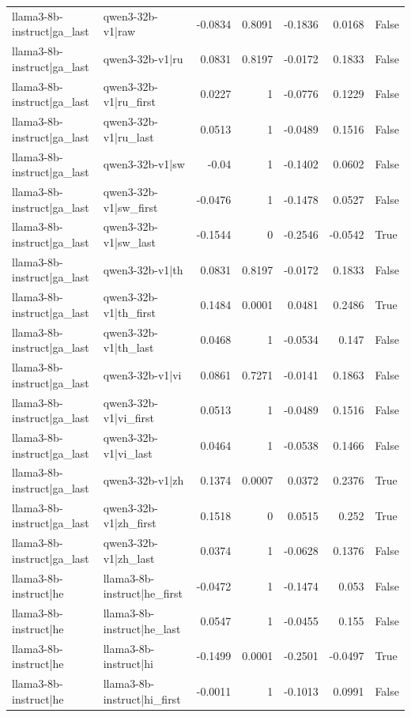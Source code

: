 \begin{table}
\begin{tabular}{l l r r r r l}
llama3-8b-instruct|ga_last & qwen3-32b-v1|raw & -0.0834 & 0.8091 & -0.1836 & 0.0168 & False \\
llama3-8b-instruct|ga_last & qwen3-32b-v1|ru & 0.0831 & 0.8197 & -0.0172 & 0.1833 & False \\
llama3-8b-instruct|ga_last & qwen3-32b-v1|ru_first & 0.0227 & 1 & -0.0776 & 0.1229 & False \\
llama3-8b-instruct|ga_last & qwen3-32b-v1|ru_last & 0.0513 & 1 & -0.0489 & 0.1516 & False \\
llama3-8b-instruct|ga_last & qwen3-32b-v1|sw & -0.04 & 1 & -0.1402 & 0.0602 & False \\
llama3-8b-instruct|ga_last & qwen3-32b-v1|sw_first & -0.0476 & 1 & -0.1478 & 0.0527 & False \\
llama3-8b-instruct|ga_last & qwen3-32b-v1|sw_last & -0.1544 & 0 & -0.2546 & -0.0542 & True \\
llama3-8b-instruct|ga_last & qwen3-32b-v1|th & 0.0831 & 0.8197 & -0.0172 & 0.1833 & False \\
llama3-8b-instruct|ga_last & qwen3-32b-v1|th_first & 0.1484 & 0.0001 & 0.0481 & 0.2486 & True \\
llama3-8b-instruct|ga_last & qwen3-32b-v1|th_last & 0.0468 & 1 & -0.0534 & 0.147 & False \\
llama3-8b-instruct|ga_last & qwen3-32b-v1|vi & 0.0861 & 0.7271 & -0.0141 & 0.1863 & False \\
llama3-8b-instruct|ga_last & qwen3-32b-v1|vi_first & 0.0513 & 1 & -0.0489 & 0.1516 & False \\
llama3-8b-instruct|ga_last & qwen3-32b-v1|vi_last & 0.0464 & 1 & -0.0538 & 0.1466 & False \\
llama3-8b-instruct|ga_last & qwen3-32b-v1|zh & 0.1374 & 0.0007 & 0.0372 & 0.2376 & True \\
llama3-8b-instruct|ga_last & qwen3-32b-v1|zh_first & 0.1518 & 0 & 0.0515 & 0.252 & True \\
llama3-8b-instruct|ga_last & qwen3-32b-v1|zh_last & 0.0374 & 1 & -0.0628 & 0.1376 & False \\
llama3-8b-instruct|he & llama3-8b-instruct|he_first & -0.0472 & 1 & -0.1474 & 0.053 & False \\
llama3-8b-instruct|he & llama3-8b-instruct|he_last & 0.0547 & 1 & -0.0455 & 0.155 & False \\
llama3-8b-instruct|he & llama3-8b-instruct|hi & -0.1499 & 0.0001 & -0.2501 & -0.0497 & True \\
llama3-8b-instruct|he & llama3-8b-instruct|hi_first & -0.0011 & 1 & -0.1013 & 0.0991 & False \\

\end{tabular}
\end{table}

